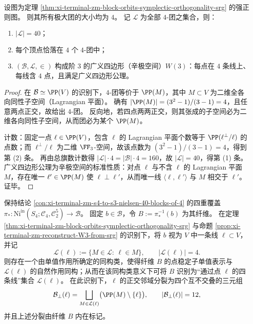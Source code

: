 \begin{proposition}\label{prop:xi-terminal-zm-reconstruct-W3-from-srg}
设图为定理 \ref{thm:xi-terminal-zm-block-orbits-symplectic-orthogonality-srg} 的强正则图。
则其所有极大团的大小均为 \(4\)。
记 \(\mathcal L\) 为全部 \(4\)-团之集合，则：
\begin{enumerate}
  \item \(|\mathcal L|=40\)；
  \item 每个顶点恰落在 \(4\) 个 \(4\)-团中；
  \item \((\mathcal B,\mathcal L,\in)\) 构成阶 \(3\) 的广义四边形（辛极空间）\(W(3)\)：每点在 \(4\) 条线上、每线含 \(4\) 点，且满足广义四边形公理。
\end{enumerate}
\end{proposition}

\begin{proof}
在 \(\mathcal B\simeq \PP(V)\) 的识别下，\(4\)-团等价于 \(\PP(M)\)，其中 \(M\subset V\) 为二维全各向同性子空间（Lagrangian 平面）。
确有 \(|\PP(M)|=(3^2-1)/(3-1)=4\)，且任意两点正交，故给出 \(4\)-团。
反向地，若四点两两正交，则其张成的子空间必为二维各向同性子空间，从而团必为某个 \(\PP(M)\)。
\par
计数：固定一点 \(\ell\in\PP(V)\)，包含 \(\ell\) 的 Lagrangian 平面个数等于 \(\PP(\ell^\perp/\ell)\) 的点数；而 \(\ell^\perp/\ell\) 为二维 \(\FF_3\)-空间，故该点数为 \((3^2-1)/(3-1)=4\)，得到第 (2) 条。
再由总旗数计数得 \(|\mathcal L|\cdot 4=|\mathcal B|\cdot 4=160\)，故 \(|\mathcal L|=40\)，得第 (1) 条。
广义四边形公理为辛极空间的标准性质：对点 \(\ell\) 与不含 \(\ell\) 的 Lagrangian 平面 \(M\)，存在唯一 \(\ell'\in\PP(M)\) 使 \(\ell\perp\ell'\)，从而唯一线 \(\langle \ell,\ell'\rangle\) 与 \(M\) 相交于 \(\ell'\)。证毕。
\end{proof}

\begin{theorem}\label{thm:xi-terminal-zm-pistar-fiber-equals-four-lines-through-point}
保持结论 \ref{con:xi-terminal-zm-s4-to-s3-nielsen-40-blocks-of-4} 的四重覆盖
\(
\pi_*:\mathrm{Ni}^{\mathrm{in}}(S_4;\mathcal C_4,\mathcal C_2^5)\to \mathcal B
\)。
固定 \(b\in\mathcal B\)，令 \(B:=\pi_*^{-1}(b)\) 为其纤维。
在定理 \ref{thm:xi-terminal-zm-block-orbits-symplectic-orthogonality-srg} 与命题 \ref{prop:xi-terminal-zm-reconstruct-W3-from-srg} 的识别下，将 \(b\) 视为 \(V\) 中一条线 \(\ell\subset V\)，并记
\[
\mathcal L(\ell):=\{M\in\mathcal L:\ \ell\in M\},
\qquad |\mathcal L(\ell)|=4.
\]
则存在一个由单值作用所确定的同构类，使得纤维 \(B\) 的点稳定子单值表示与 \(\mathcal L(\ell)\) 的自然作用同构；从而在该同构类意义下可将 \(B\) 识别为“通过点 \(\ell\) 的四条线”集合 \(\mathcal L(\ell)\)。
在此识别下，\(\ell\) 的正交邻域分裂为四个互不交叠的三元组
\[
\mathcal B_\perp(\ell)
=
\bigsqcup_{M\in\mathcal L(\ell)}\bigl(\PP(M)\setminus\{\ell\}\bigr),
\qquad |\mathcal B_\perp(\ell)|=12,
\]
并且上述分裂由纤维 \(B\) 内在标记。
\end{theorem}

